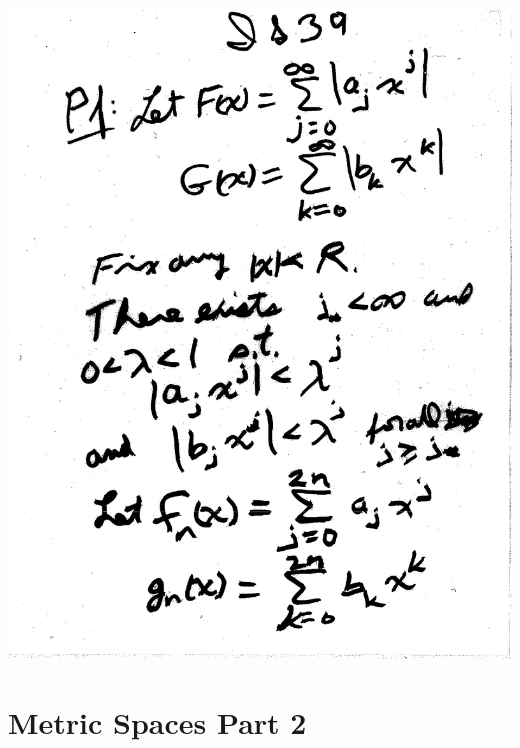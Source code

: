 \documentclass[10pt,a4paper]{article}
\begin{document}
{{\\\includegraphics[scale=0.5]{Pages/InfiniteSeries_39.pdf}




\section{Metric Spaces Part 2}



}}
\end{document}
